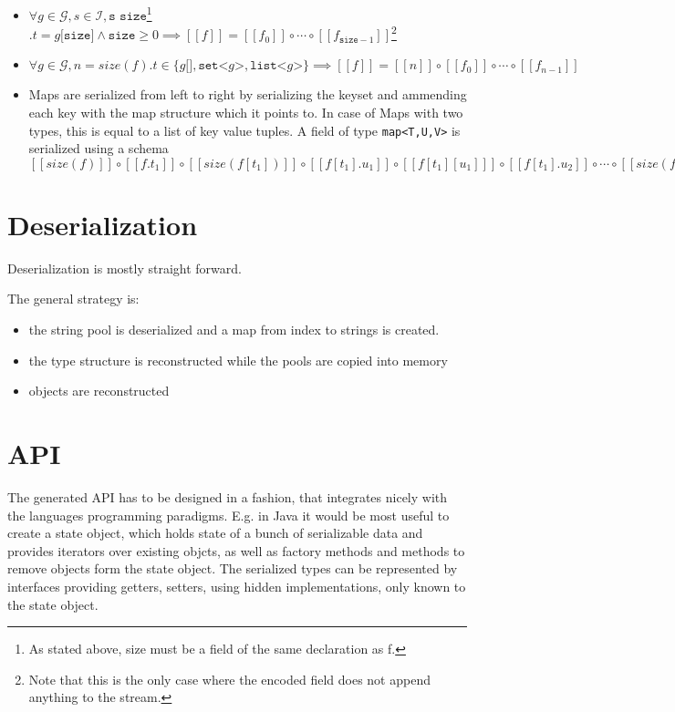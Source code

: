 \documentclass[a4paper,10pt]{article}
\newcommand{\den}[1]{[\![#1]\!]}
\begin{document}
\begin{itemize}
 \item $\forall g \in \mathcal{G}, s \in \mathcal{I}, \texttt{s size}$\footnote{As stated above, size must be a field of the same declaration as f.} $. t = g\texttt{[size]} \wedge \texttt{size} \geq 0 \implies \den{f} = \den{f_0} \circ \cdots \circ \den{f_{\texttt{size}-1}}$\footnote{Note that this is the only case where the encoded field does not append anything to the stream.}
 
 \item $\forall g \in \mathcal{G}, n = size(f). t \in \{g\texttt{[]}, \texttt{set<}g\texttt{>}, \texttt{list<}g\texttt{>}\} \implies \den{f} = \den{n} \circ \den{f_0} \circ \cdots \circ \den{f_{n-1}}$
 
 \item Maps are serialized from left to right by serializing the keyset and ammending each key with the map structure which it points to. In case of Maps with two types, this is equal to a list of key value tuples.
 A field of type \verb/map<T,U,V>/ is serialized using a schema $ \den{size(f)} \circ \den{f.t_1} \circ \den{size(f[t_1])} \circ \den{f[t_1].u_1} \circ \den{f[t_1][u_1]} \circ \den{f[t_1].u_2} \circ \cdots \circ \den{size(f[t_2])} \circ \cdots \circ \den{f[t_n][u_m]}$
\end{itemize}




\section{Deserialization}

Deserialization is mostly straight forward.

The general strategy is:
\begin{itemize}
 \item the string pool is deserialized and a map from index to strings is created.
 \item the type structure is reconstructed while the pools are copied into memory
 \item objects are reconstructed
\end{itemize}


\section{API}

The generated API has to be designed in a fashion, that integrates nicely with the languages programming paradigms. E.g. in Java it would be most useful to create a state object, which holds state of a bunch of serializable data and provides iterators over existing objcts, as well as factory methods and methods to remove objects form the state object. The serialized types can be represented by interfaces providing getters, setters, using hidden implementations, only known to the state object.
\end{document}
